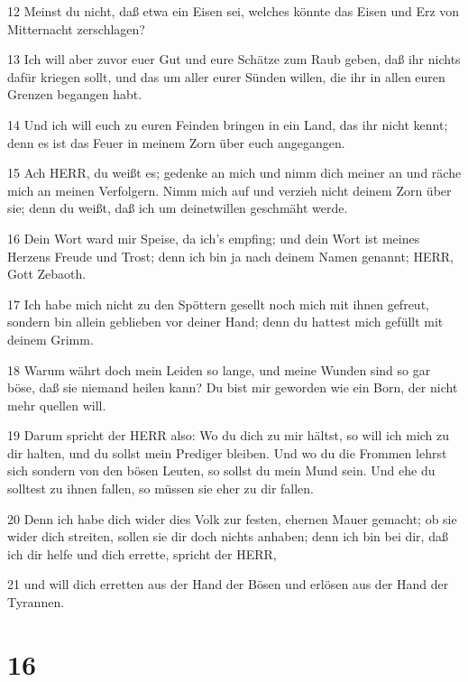 \par 12 Meinst du nicht, daß etwa ein Eisen sei, welches könnte das Eisen und Erz von Mitternacht zerschlagen?
\par 13 Ich will aber zuvor euer Gut und eure Schätze zum Raub geben, daß ihr nichts dafür kriegen sollt, und das um aller eurer Sünden willen, die ihr in allen euren Grenzen begangen habt.
\par 14 Und ich will euch zu euren Feinden bringen in ein Land, das ihr nicht kennt; denn es ist das Feuer in meinem Zorn über euch angegangen.
\par 15 Ach HERR, du weißt es; gedenke an mich und nimm dich meiner an und räche mich an meinen Verfolgern. Nimm mich auf und verzieh nicht deinem Zorn über sie; denn du weißt, daß ich um deinetwillen geschmäht werde.
\par 16 Dein Wort ward mir Speise, da ich's empfing; und dein Wort ist meines Herzens Freude und Trost; denn ich bin ja nach deinem Namen genannt; HERR, Gott Zebaoth.
\par 17 Ich habe mich nicht zu den Spöttern gesellt noch mich mit ihnen gefreut, sondern bin allein geblieben vor deiner Hand; denn du hattest mich gefüllt mit deinem Grimm.
\par 18 Warum währt doch mein Leiden so lange, und meine Wunden sind so gar böse, daß sie niemand heilen kann? Du bist mir geworden wie ein Born, der nicht mehr quellen will.
\par 19 Darum spricht der HERR also: Wo du dich zu mir hältst, so will ich mich zu dir halten, und du sollst mein Prediger bleiben. Und wo du die Frommen lehrst sich sondern von den bösen Leuten, so sollst du mein Mund sein. Und ehe du solltest zu ihnen fallen, so müssen sie eher zu dir fallen.
\par 20 Denn ich habe dich wider dies Volk zur festen, ehernen Mauer gemacht; ob sie wider dich streiten, sollen sie dir doch nichts anhaben; denn ich bin bei dir, daß ich dir helfe und dich errette, spricht der HERR,
\par 21 und will dich erretten aus der Hand der Bösen und erlösen aus der Hand der Tyrannen.

\chapter{16}

